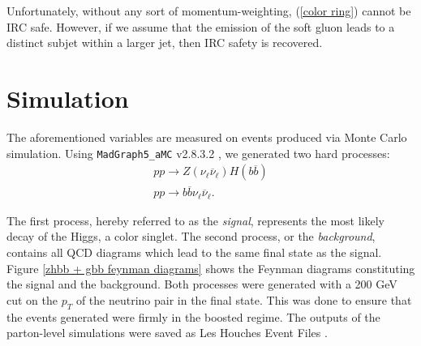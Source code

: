 \documentclass[10pt,a4paper]{book}
\def\code#1{\texttt{#1}}
\begin{document}
Unfortunately, without any sort of momentum-weighting, (\ref{color ring}) cannot be IRC safe. However, if we assume that the emission of the soft gluon leads to a distinct subjet within a larger jet, then IRC safety is recovered.

\section{Simulation}
\label{Simulation}

The aforementioned variables are measured on events produced via Monte Carlo simulation. Using \code{MadGraph5\_aMC} v2.8.3.2 \cite{Alwall:2014hca}, we generated two hard processes:
\begin{gather}
p p \rightarrow Z(\nu_\ell \overline{\nu}_\ell) H(b\overline{b}) \\
p p \rightarrow b\overline{b} \nu_\ell \overline{\nu}_\ell.
\end{gather}

The first process, hereby referred to as the \emph{signal}, represents the most likely decay of the Higgs, a color singlet. The second process, or the \emph{background}, contains all QCD diagrams which lead to the same final state as the signal. Figure \ref{zhbb + gbb feynman diagrams} shows the Feynman diagrams constituting the signal and the background. Both processes were generated with a 200 GeV cut on the $p_T$ of the neutrino pair in the final state. This was done to ensure that the events generated were firmly in the boosted regime. The outputs of the parton-level simulations were saved as Les Houches Event Files \cite{Alwall:2006yp}.
\end{document}
